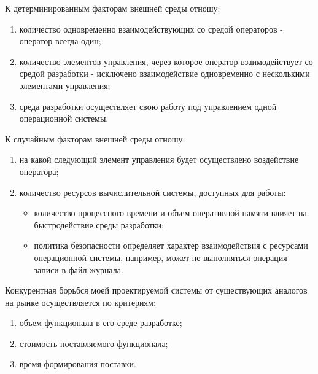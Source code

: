 К детерминированным факторам внешней среды отношу:
\begin{enumerate}
    \item количество одновременно взаимодействующих со средой операторов - оператор всегда один;
    \item количество элементов управления, через которое оператор взаимодействует со средой разработки - исключено взаимодействие одновременно с несколькими элементами управления;
    \item среда разработки осуществляет свою работу под управлением одной операционной системы.
\end{enumerate}

К случайным факторам внешней среды отношу:
\begin{enumerate}
    \item на какой следующий элемент управления будет осуществлено воздействие оператора;
    \item количество ресурсов вычислительной системы, доступных для работы:
    \begin{itemize}
        \item количество процессного времени и объем оперативной памяти влияет на быстродействие среды разработки;
        \item политика безопасности определяет характер взаимодействия с ресурсами операционной системы, например, может не выполняться операция записи в файл журнала.
    \end{itemize}
\end{enumerate}

Конкурентная борьбся моей проектируемой системы от существующих аналогов на рынке осуществляется по критериям:
\begin{enumerate}
    \item объем функционала в его среде разработке;
    \item стоимость поставляемого функционала;
    \item время формирования поставки.
\end{enumerate}